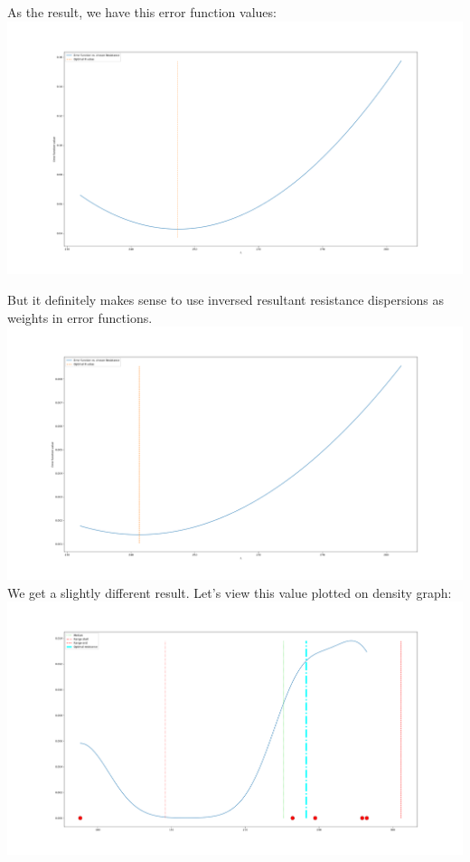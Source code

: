 \documentclass[11pt]{memoir}
\begin{document}
    As the result, we have this error function values:\newline
    \includegraphics[width=\linewidth]{../graphs/Error_function_without_weights.png}
    \newline

    But it definitely makes sense to use inversed resultant resistance dispersions as weights in error functions.\newline
    \includegraphics[width=\linewidth]{../graphs/Error_function_with_weights.png}
    \newline
    We get a slightly different result.\newline
    Let's view this value plotted on density graph:\newline
    \includegraphics[width=\linewidth]{../graphs/distribution_with_best_value.png}
\end{document}
